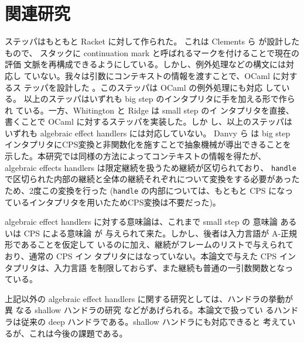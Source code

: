 \section{関連研究}
\label{section:related}

ステッパはもともと Racket に対して作られた。
これは Clements ら \cite{clements01} が設計したもので、
スタックに continuation mark と呼ばれるマークを付けることで現在の評価
文脈を再構成できるようにしている。しかし、例外処理などの構文には対応し
ていない。我々は引数にコンテキストの情報を渡すことで、OCaml に対するス
テッパを設計した \cite{FCA19}。このステッパは OCaml の例外処理にも対応
している。
以上のステッパはいずれも big step のインタプリタに手を加える形で作られ
ている。一方、Whitington と Ridge \cite{EPTCS294.3} は small step のイ
ンタプリタを直接、書くことで OCaml に対するステッパを実装した。しか
し、以上のステッパはいずれも algebraic effect handlers には対応していない。
Danvy ら \cite{10.1145/1411204.1411206} は
big step インタプリタにCPS変換と非関数化を施すことで抽象機械が導出できることを
示した。本研究では同様の方法によってコンテキストの情報を得たが、
algebraic effects handlers は限定継続を扱うため継続が区切られており、
\texttt{handle} で区切られた内部の継続と全体の継続それぞれについて変換をする必要があったため、2度この変換を行った
(\texttt{handle} の内部については、もともと CPS になっているインタプリタを用いたためCPS変換は不要だった)。

algebraic effect handlers に対する意味論は、これまで small step の
意味論 \cite{10.1145/2500365.2500590}
あるいは CPS による意味論 \cite{e6cb0c3222794e48bf38cf44e46fe4aa} が
与えられて来た。しかし、後者は入力言語が A-正規形であることを仮定して
いるのに加え、継続がフレームのリストで与えられており、通常の CPS イン
タプリタにはなっていない。本論文で与えた CPS インタプリタは、入力言語
を制限しておらず、また継続も普通の一引数関数となっている。

上記以外の algebraic effect handlers に関する研究としては、ハンドラの挙動が異
なる shallow ハンドラの研究 \cite{10.1007/978-3-030-02768-1_22}
などがあげられる。本論文で扱ってい
るハンドラは従来の deep ハンドラである。shallow ハンドラにも対応できると
考えているが、これは今後の課題である。

